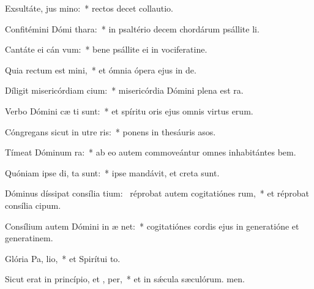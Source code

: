 \item Exsultáte, jus  mino:~* rectos decet collautio.
\item Confitémini Dómi  thara:~* in psaltério decem chordárum psállite li.
\item Cantáte ei cán vum:~* bene psállite ei in vociferatine.
\item Quia rectum est  mini,~* et ómnia ópera ejus in de.
\item Díligit misericórdiam  cium:~* misericórdia Dómini plena est ra.
\item Verbo Dómini cæ ti sunt:~* et spíritu oris ejus omnis virtus erum.
\item Cóngregans sicut in utre  ris:~* ponens in thesáuris asos.
\item Tímeat Dóminum  ra:~* ab eo autem commoveántur omnes inhabitántes bem.
\item Quóniam ipse di,  ta sunt:~* ipse mandávit, et creta sunt.
\item Dóminus díssipat consília tium:~\pscross{} réprobat autem cogitatiónes rum,~* et réprobat consília cipum.
\item Consílium autem Dómini in æ net:~* cogitatiónes cordis ejus in generatióne et generatinem.
\item Glória Pa,  lio,~* et Spirítui to.
\item Sicut erat in princípio, et ,  per,~* et in sǽcula sæculórum. men.
